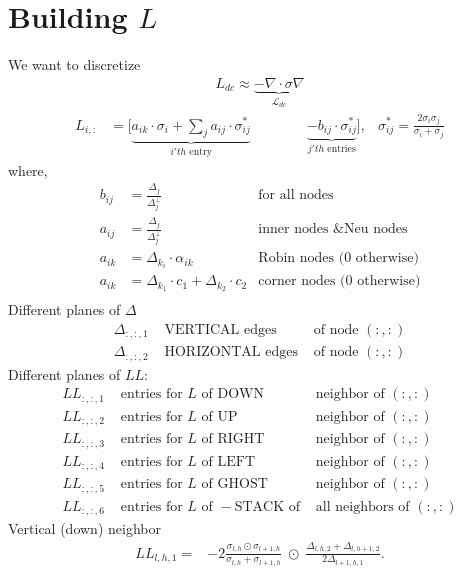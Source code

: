 \documentclass[a4paper,12pt]{article}
\begin{document}
\section{Building $L$}
We want to discretize
\begin{align*}
L_{dc} \approx \underbrace{-\nabla\cdot\sigma\nabla}_{\mathcal{L}_{dc}}
\end{align*}
\begin{align*}
L_{i,:} &=  
\Big[
\underbrace{ 
a_{ik}\cdot\sigma_i +
\sum_j a_{ij}\cdot\sigma_{ij}^{*}
}_{i'th \text{ entry}}
\hspace{4em}
\underbrace{ 
-b_{ij}\cdot\sigma_{ij}^{*}
}_{j'th \text{ entries}}
\Big],
&
\sigma_{ij}^{*} = \frac{2\sigma_i\sigma_j}{\sigma_i+\sigma_j}
\end{align*}
where,
\begin{align*}
b_{ij} &=
\frac{\Delta_j}{\Delta_{j}^{\bot}} & \text{for all nodes} \\
a_{ij} &=
\frac{\Delta_j}{\Delta_{j}^{\bot}} & \text{inner nodes \& Neu nodes} \\
a_{ik} &=
\Delta_{k_i} \cdot \alpha_{ik}
 & \text{Robin nodes ($0$ otherwise)} \\
 a_{ik} &=
 \Delta_{k_1} \cdot c_{1} + \Delta_{k_2} \cdot c_{2}
 & \text{corner nodes ($0$ otherwise)} \\
\end{align*}
Different planes of $\Delta$
\begin{align*}
\Delta_{:,:,1} & \text{ VERTICAL edges} & \text{ of node }(:,:) \\
\Delta_{:,:,2} & \text{ HORIZONTAL edges} & \text{ of node }(:,:)
\end{align*}
%
Different planes of $LL$:
\begin{align*}
LL_{:,:,1} & \text{ entries for $L$ of DOWN} & \text{ neighbor of }(:,:) \\
LL_{:,:,2} & \text{ entries for $L$ of UP} & \text{ neighbor of }(:,:) \\
LL_{:,:,3} & \text{ entries for $L$ of RIGHT} & \text{ neighbor of }(:,:) \\
LL_{:,:,4} & \text{ entries for $L$ of LEFT} & \text{ neighbor of }(:,:) \\
LL_{:,:,5} & \text{ entries for $L$ of GHOST} & \text{ neighbor of }(:,:) \\
LL_{:,:,6} & \text{ entries for $L$ of $-$STACK of} & \text{ all neighbors of }(:,:)
\end{align*}
Vertical (down) neighbor
\begin{align*}
LL_{l,h,1} =&
 -2\frac{\sigma_{l,h} \odot \sigma_{l+1,h} }	{\sigma_{l,h} + \sigma_{l+1,h}} \; \odot \;
 \frac{\Delta_{l,h,2} + \Delta_{l,h+1,2} } {2\Delta_{l+1,h,1} }.
\end{align*}
\end{document}
